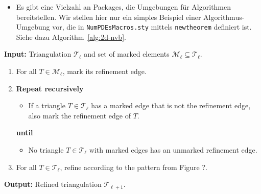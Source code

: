 \begin{itemize}
  \item Es gibt eine Vielzahl an Packages, die Umgebungen für Algorithmen bereitstellen.
  Wir stellen hier nur ein simples Beispiel einer Algorithmus-Umgebung vor, die in \verb$NumPDEsMacros.sty$ mittels \verb$newtheorem$ definiert ist.
  Siehe dazu Algorithm~\ref{alg:2d-nvb}.
\end{itemize}

\pagebreak

\begin{algorithm}\label{alg:2d-nvb}
  \textbf{Input:} Triangulation $\mathcal{T}_\ell$ and set of marked elements $\mathcal{M}_\ell \subseteq \mathcal{T}_\ell$.
  \begin{enumerate}[topsep=0pt,itemsep=-1ex,partopsep=1ex,parsep=1ex]
    \item For all $T \in \mathcal{M}_\ell$, mark its refinement edge.
    \item \textbf{Repeat recursively}\label{alg-step:nvb-closure}
      \begin{itemize}[label={},leftmargin=*,labelindent=1ex,topsep=-1ex,itemsep=-1ex,partopsep=1ex,parsep=1ex]
        \item If a triangle $T \in \mathcal{T}_\ell$ has a marked edge that is not the refinement edge, also mark the refinement edge of $T$.
      \end{itemize}
      \textbf{until}
      \begin{itemize}[label={},leftmargin=*,labelindent=1ex,topsep=-1ex,itemsep=-1ex,partopsep=1ex,parsep=1ex]
        \item No triangle $T \in \mathcal{T}_\ell$ with marked edges has an unmarked refinement edge.
      \end{itemize}
    \item For all $T \in \mathcal{T}_\ell$, refine according to the pattern from Figure ?.
  \end{enumerate}
  \textbf{Output:} Refined triangulation $\mathcal{T}_{\ell+1}$.
\end{algorithm}


